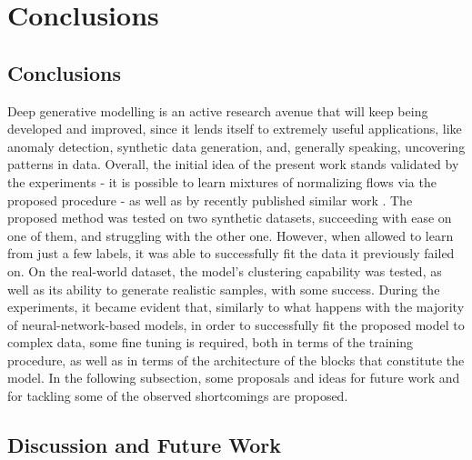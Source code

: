 \section{Conclusions}
\label{section:conclusions}

\subsection{Conclusions}
\label{subsection:conclusions}
Deep generative modelling is an active research avenue that will keep being
developed and improved, since it lends itself to extremely useful applications,
like anomaly detection, synthetic data generation, and, generally speaking,
uncovering patterns in data.
Overall, the initial idea of the present work stands validated by the experiments - 
it is possible to learn mixtures of normalizing flows via the proposed procedure - as well
as by recently published similar work \autocites{RAD}{semisuplearning_nflows}.
The proposed method was tested on two synthetic datasets, succeeding with ease
on one of them, and struggling with the other one. However, when allowed to learn
from just a few labels, it was able to successfully fit the data it previously
failed on. On the real-world dataset, the model's clustering capability was tested,
as well as its ability to generate realistic samples, with some success.
During the experiments, it became evident that, similarly to what happens with
the majority of neural-network-based models, in order to successfully fit the
proposed model to complex data, some fine tuning is required, both in terms of the
training procedure, as well as in terms of the architecture of the blocks that
constitute the model. In the following subsection, some proposals and ideas for
future work and for tackling some of the observed shortcomings are proposed.

\subsection{Discussion and Future Work}
\label{subsection:future}

